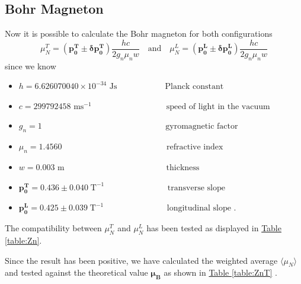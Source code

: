 \documentclass[a4paper,12pt,abstracton]{scrartcl}
\begin{document}
\clearpage

\subsection{Bohr Magneton}
Now it is possible to calculate the Bohr magneton for both configurations $$\mu_N^T= (\boldsymbol{p_0^T}\pm \boldsymbol{\delta p_0^T})\frac{hc}{2g_n\mu_n w} \quad\text{and}\quad \mu_N^L= (\boldsymbol{p_0^L}\pm \boldsymbol{\delta p_0^L})\frac{hc}{2g_n\mu_n w}$$ 
 since we know 
\begin{itemize}
\item $h=6.626070040\times10^{-34} \text{ Js}  \;\,\quad\qquad\qquad\text{ Planck constant}$  
\item $c=299792458 \text{ ms}^{-1}  \quad\qquad\qquad\qquad\qquad\text{speed of light in the vacuum}$
\item $g_n=1   \;\;\qquad\qquad\qquad\qquad\qquad\qquad\qquad\text{ gyromagnetic factor}$
\item $\mu_n= 1.4560    \;\qquad\qquad\qquad\qquad\qquad\qquad\text{ refractive index}$
\item  $w= 0.003 \text{ m} \;\qquad\qquad\qquad\qquad\qquad\qquad\text{thickness}$
\item $\boldsymbol{p_0^{T}}=0.436 \pm 0.040 \;\text{T}^{-1} \;\quad\qquad\qquad\qquad\text{ transverse slope}$
\item $\boldsymbol{p_0^{L}}=0.425 \pm 0.039 \;\text{T}^{-1} \;\quad\qquad\qquad\qquad\text{ longitudinal slope .}$\newline
\end{itemize}
The compatibility between $\mu_N^T$ and $\mu_N^L$ has been tested as displayed in \hyperref[table:Zn]{Table \ref*{table:Zn}}. 
\begin{table}[H]
\caption{}
\centering
{}
\label{table:Zn}
\end{table}

Since the result has been positive, we have calculated the weighted average $ \langle \mu_N\rangle$ and tested against the theoretical value $\boldsymbol{\mu_B}$ as shown in \hyperref[table:ZnT]{Table \ref*{table:ZnT}} .
\end{document}
